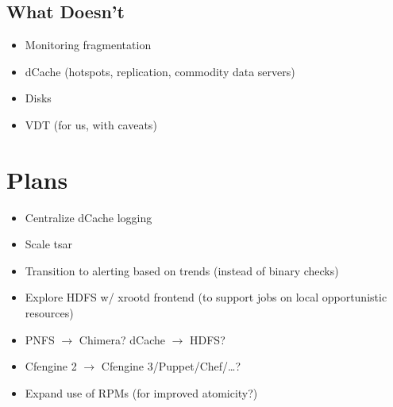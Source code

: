 \documentclass{beamer}
\begin{document}
\subsection{What Doesn't}
\begin{frame}
\begin{itemize}
	\item Monitoring fragmentation
	\item dCache (hotspots, replication, commodity data servers)
	\item Disks
	\item VDT (for us, with caveats)
\end{itemize}
\end{frame}

\section{Plans}
\begin{frame}
\begin{itemize}
	\item Centralize dCache logging
	\item Scale tsar
	\item Transition to alerting based on trends (instead of binary checks)
	\item Explore HDFS w/ xrootd frontend (to support jobs on local opportunistic resources)
	\item PNFS $\rightarrow$ Chimera? dCache $\rightarrow$ HDFS?
	\item Cfengine 2 $\rightarrow$ Cfengine 3/Puppet/Chef/\ldots{}?
	\item Expand use of RPMs (for improved atomicity?)
\end{itemize}
\end{frame}
\end{document}
